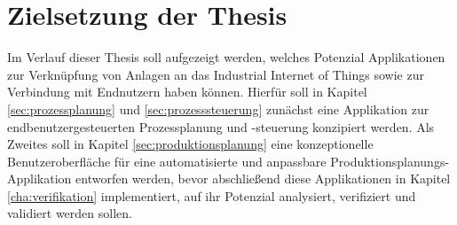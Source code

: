 \section{Zielsetzung der Thesis}
\label{sec:zielsetzung}

Im Verlauf dieser Thesis soll aufgezeigt werden, welches Potenzial Applikationen zur Verknüpfung von Anlagen an das Industrial Internet of Things sowie zur Verbindung mit Endnutzern haben können. Hierfür soll in Kapitel \ref{sec:prozessplanung} und \ref{sec:prozesssteuerung} zunächst eine Applikation zur endbenutzergesteuerten Prozessplanung und -steuerung konzipiert werden. Als Zweites soll in Kapitel \ref{sec:produktionsplanung} eine konzeptionelle Benutzeroberfläche für eine automatisierte und anpassbare Produktionsplanungs-Applikation entworfen werden, bevor abschließend diese Applikationen in Kapitel \ref{cha:verifikation} implementiert, auf ihr Potenzial analysiert, verifiziert und validiert werden sollen.
